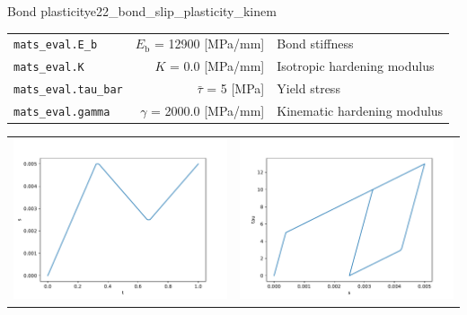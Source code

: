 \documentclass[main.tex]{subfiles}
\begin{document}
\begin{bmcsex}{Bond plasticity}{e22_bond_slip_plasticity_kinem}
\begin{center}
{\begin{longtable}{lrp{4cm}}
\texttt{mats\_eval.E\_b} & $E_\mathrm{b}$ = 12900 [MPa/mm] & {\footnotesize Bond stiffness}  \\
            \texttt{mats\_eval.K} & $K$ = 0.0 [MPa/mm] & {\footnotesize Isotropic hardening modulus}  \\
            \texttt{mats\_eval.tau\_bar} & $\bar{\tau}$ = 5 [MPa] & {\footnotesize Yield stress}  \\
            \texttt{mats\_eval.gamma} & $\gamma$ = 2000.0 [MPa/mm] & {\footnotesize Kinematic hardening modulus}  \\
            \bottomrule 
\end{longtable}
}

\noindent
\begin{longtable}{L{7.5cm}L{7.5cm}}
\includegraphics[width=7.5cm]{examples/e22_bond_slip_plasticity_kinem/fig_s-t.pdf}
 & 
\includegraphics[width=7.5cm]{examples/e22_bond_slip_plasticity_kinem/fig_tau-s.pdf}
 \\\end{longtable}


\end{center}
\end{bmcsex}
\end{document}
